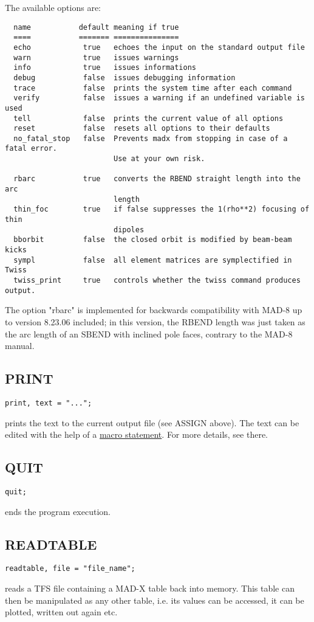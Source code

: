The available options are: 
\begin{verbatim}
  name           default meaning if true
  ====           ======= ===============
  echo            true   echoes the input on the standard output file
  warn            true   issues warnings
  info            true   issues informations
  debug           false  issues debugging information
  trace           false  prints the system time after each command
  verify          false  issues a warning if an undefined variable is used
  tell            false  prints the current value of all options
  reset           false  resets all options to their defaults
  no_fatal_stop   false  Prevents madx from stopping in case of a fatal error. 
                         Use at your own risk.

  rbarc           true   converts the RBEND straight length into the arc 
                         length
  thin_foc        true   if false suppresses the 1(rho**2) focusing of thin 
                         dipoles
  bborbit         false  the closed orbit is modified by beam-beam kicks
  sympl           false  all element matrices are symplectified in Twiss
  twiss_print     true   controls whether the twiss command produces output.
\end{verbatim} 

The option "rbarc" is implemented for backwards compatibility with MAD-8
up to version 8.23.06 included; in this version, the RBEND length was
just taken as the arc length of an SBEND with inclined pole faces,
contrary to the MAD-8 manual.  


\subsection{PRINT}
\begin{verbatim}
print, text = "...";
\end{verbatim} 
prints the text to the current output file (see ASSIGN above). The text
can be edited with the help of a  \href{special.html#macro}{macro
  statement}. For more details, see there.  


\subsection{QUIT}
\begin{verbatim}
quit;
\end{verbatim} 
ends the program execution. 


\subsection{READTABLE}
\begin{verbatim}
readtable, file = "file_name";
\end{verbatim} 
reads a TFS file containing a MAD-X table back into memory. This table
can then be manipulated as any other table, i.e. its values can be
accessed, it can be plotted, written out again etc.  


